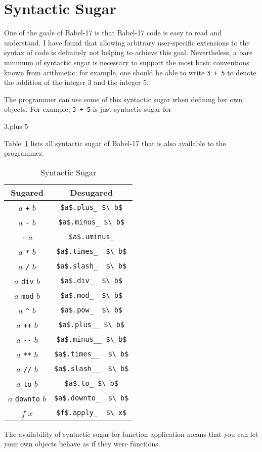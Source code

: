 \documentclass[11pt]{amsart}
\newcommand{\babelsrc}[1] {\lstinline!#1!}
\begin{document}
\section{Syntactic Sugar}
One of the goals of Babel-17 is that Babel-17 code is easy to read and understand. I have found that allowing arbitrary user-specific extensions to the syntax of code is definitely not helping to achieve this goal. Nevertheless, a bare minimum of syntactic sugar is necessary to support the most basic conventions known from arithmetic; for example, one should be able to write \texttt{3 + 5} to denote the addition of the integer 3 and the integer 5.

The programmer can use some of this syntactic sugar when defining her own objects. For example, \texttt{3 + 5} is just syntactic sugar for 
\begin{babellisting}
3.plus 5
\end{babellisting} 
Table~\ref{tab:syntacticsugar} lists all syntactic sugar of Babel-17 that is also available to the programmer. 
\begin{table}
\caption{Syntactic Sugar}
\begin{tabular}{c|c}
\textbf{Sugared} & \textbf{Desugared} \\\hline\hline
$a$ \verb!+! $b$ & \babelsrc{$a$.plus_ $\ b$} \\\hline
$a$ \verb!-! $b$ & \babelsrc{$a$.minus_ $\ b$} \\\hline
\verb!-! $a$ & \babelsrc{$a$.uminus_} \\\hline
$a$ \verb!*! $b$ & \babelsrc{$a$.times_  $\ b$} \\\hline
$a$ \verb!/! $b$ & \babelsrc{$a$.slash_  $\ b$} \\\hline
$a$ \verb!div! $b$ & \babelsrc{$a$.div_  $\ b$} \\\hline
$a$ \verb!mod! $b$ & \babelsrc{$a$.mod_  $\ b$} \\\hline
$a$ \verb+^+ $b$ & \babelsrc{$a$.pow_  $\ b$} \\\hline
$a$ \verb!++! $b$ & \babelsrc{$a$.plus__ $\ b$} \\\hline
$a$ \verb!--! $b$ & \babelsrc{$a$.minus__ $\ b$} \\\hline
$a$ \verb!**! $b$ & \babelsrc{$a$.times__  $\ b$}\\\hline
$a$ \verb!//! $b$ & \babelsrc{$a$.slash__  $\ b$}\\\hline
$a$ \verb!to! $b$ & \babelsrc{$a$.to_ $\ b$}\\\hline
$a$ \verb!downto! $b$ & \babelsrc{$a$.downto_  $\ b$}\\\hline 
$f$ $x$ &  \babelsrc{$f$.apply_  $\ x$}
\end{tabular}
\label{tab:syntacticsugar}
\end{table}
The availability of syntactic sugar for function application means that you can let your own objects behave as if they were functions. 
\end{document}
